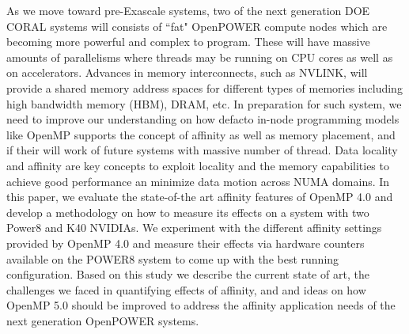 As we move toward pre-Exascale systems, two of the next generation DOE CORAL systems will consists of ``fat" OpenPOWER compute nodes  which are  becoming more powerful and complex to program. These will have massive amounts of parallelisms where threads may be running on CPU cores as well as on accelerators. Advances in memory interconnects, such as NVLINK, will provide a 
shared memory address spaces for different types of memories including high bandwidth memory (HBM), DRAM, etc. 
In preparation for such system, we need to improve our understanding on how defacto in-node programming models like OpenMP supports
the concept of affinity as well as memory placement, and if their will work of future systems with massive number of thread. Data locality and affinity are key concepts to exploit locality and the memory capabilities to achieve good performance an minimize data motion across NUMA domains. In this  paper, we evaluate the state-of-the art affinity features of OpenMP 4.0 and develop a methodology on how to measure its effects on a system with two Power8 and K40 NVIDIAs. We experiment with the different affinity settings provided by OpenMP 4.0 and 
measure their effects via hardware counters available on the POWER8 system to come up with the best running configuration. Based on this study we describe the current state of art, the challenges we faced in quantifying effects of affinity, and and ideas on how OpenMP 5.0 should be improved to address the affinity application needs of the next generation OpenPOWER systems.